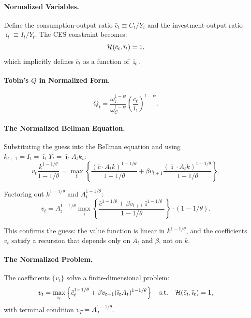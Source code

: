 \paragraph{Normalized Variables.}
Define the consumption-output ratio $\bar{c}_t \equiv C_t / Y_t$ and the investment-output ratio $\bar{\imath}_t \equiv I_t / Y_t$. The CES constraint becomes:
\begin{equation}
\mathcal{H}(\bar{c}_t, \bar{\imath}_t) = 1,
\label{eq:ac-T-normalized-ces}
\end{equation}
which implicitly defines $\bar{c}_t$ as a function of $\bar{\imath}_t$.

\paragraph{Tobin's $Q$ in Normalized Form.}
\begin{equation}
Q_t = \frac{\omega_I^{1-\psi}}{\omega_C^{1-\psi}} \left( \frac{\bar{c}_t}{\bar{\imath}_t} \right)^{1-\psi}.
\label{eq:ac-T-Q-normalized}
\end{equation}

\paragraph{The Normalized Bellman Equation.}
Substituting the guess into the Bellman equation and using $k_{t+1} = I_t = \bar{\imath}_t Y_t = \bar{\imath}_t A_t k_t$:
\begin{equation}
v_t \frac{k^{1-1/\theta}}{1-1/\theta} = \max_{\bar{\imath}} \left\{ \frac{(\bar{c} \cdot A_t k)^{1-1/\theta}}{1-1/\theta} + \beta v_{t+1} \frac{(\bar{\imath} \cdot A_t k)^{1-1/\theta}}{1-1/\theta} \right\}.
\label{eq:ac-T-bellman-sub}
\end{equation}

Factoring out $k^{1-1/\theta}$ and $A_t^{1-1/\theta}$:
\begin{equation}
v_t = A_t^{1-1/\theta} \max_{\bar{\imath}} \left\{ \frac{\bar{c}^{1-1/\theta} + \beta v_{t+1} \bar{\imath}^{1-1/\theta}}{1-1/\theta} \right\} \cdot (1-1/\theta).
\label{eq:ac-T-bellman-normalized}
\end{equation}

This confirms the guess: the value function is linear in $k^{1-1/\theta}$, and the coefficients $v_t$ satisfy a recursion that depends only on $A_t$ and $\beta$, not on $k$.

\paragraph{The Normalized Problem.}
The coefficients $\{v_t\}$ solve a finite-dimensional problem:
\begin{equation}
v_t = \max_{\bar{\imath}_t} \left\{ \bar{c}_t^{1-1/\theta} + \beta v_{t+1} (\bar{\imath}_t A_t)^{1-1/\theta} \right\} \quad \text{s.t.} \quad \mathcal{H}(\bar{c}_t, \bar{\imath}_t) = 1,
\label{eq:ac-T-v-recursion}
\end{equation}
with terminal condition $v_T = A_T^{1-1/\theta}$.

